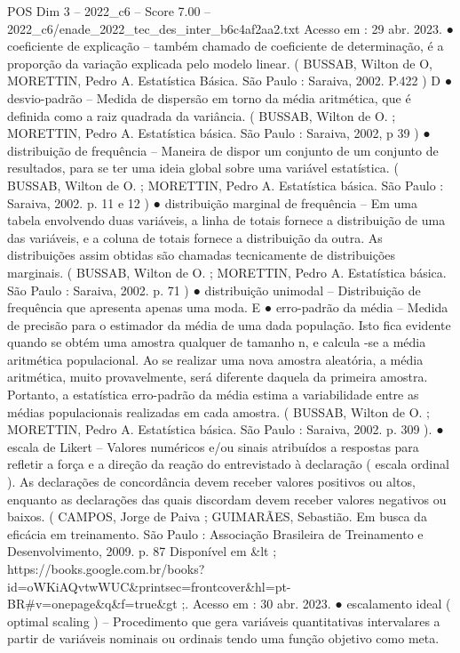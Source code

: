 \begin{textsample}{POS Dim 3 – 2022\_c6 – Score 7.00 – 2022\_c6/enade\_2022\_tec\_des\_inter\_b6c4af2aa2.txt}
Acesso em : 29 abr. 2023. {\EmojiFont ●} coeficiente de explicação – também chamado de coeficiente de determinação, é a proporção da variação explicada pelo modelo linear. ( BUSSAB, Wilton de O, MORETTIN, Pedro A.
Estatística Básica.
São Paulo : Saraiva, 2002.
P.422 ) D {\EmojiFont ●} desvio-padrão – Medida de dispersão em torno da média aritmética, que é definida como a raiz quadrada da variância. ( BUSSAB, Wilton de O. ; MORETTIN, Pedro A.
Estatística básica.
São Paulo : Saraiva, 2002, p 39 ) {\EmojiFont ●} distribuição de frequência – Maneira de dispor um conjunto de um conjunto de resultados, para se ter uma ideia global sobre uma variável estatística. ( BUSSAB, Wilton de O. ; MORETTIN, Pedro A.
Estatística básica.
São Paulo : Saraiva, 2002. p. 11 e 12 ) {\EmojiFont ●} distribuição marginal de frequência – Em uma tabela envolvendo duas variáveis, a linha de totais fornece a distribuição de uma das variáveis, e a coluna de totais fornece a distribuição da outra.
As distribuições assim obtidas são chamadas tecnicamente de distribuições marginais. ( BUSSAB, Wilton de O. ; MORETTIN, Pedro A.
Estatística básica.
São Paulo : Saraiva, 2002. p. 71 ) {\EmojiFont ●} distribuição unimodal – Distribuição de frequência que apresenta apenas uma moda.
E {\EmojiFont ●} erro-padrão da média – Medida de precisão para o estimador da média de uma dada população.
Isto fica evidente quando se obtém uma amostra qualquer de tamanho n, e calcula -se a média aritmética populacional.
Ao se realizar uma nova amostra aleatória, a média aritmética, muito provavelmente, será diferente daquela da primeira amostra.
Portanto, a estatística erro-padrão da média estima a variabilidade entre as médias populacionais realizadas em cada amostra. ( BUSSAB, Wilton de O. ; MORETTIN, Pedro A.
Estatística básica.
São Paulo : Saraiva, 2002. p. 309 ). {\EmojiFont ●} escala de Likert – Valores numéricos e/ou sinais atribuídos a respostas para refletir a força e a direção da reação do entrevistado à declaração ( escala ordinal ).
As declarações de concordância devem receber valores positivos ou altos, enquanto as declarações das quais discordam devem receber valores negativos ou baixos. ( CAMPOS, Jorge de Paiva ; GUIMARÃES, Sebastião.
Em busca da eficácia em treinamento.
São Paulo : Associação Brasileira de Treinamento e Desenvolvimento, 2009. p. 87 Disponível em \&lt ; https://books.google.com.br/books? id=oWKiAQvtwWUC\&printsec=frontcover\&hl=pt-BR\#v=onepage\&q\&f=true\&gt ;.
Acesso em : 30 abr. 2023. {\EmojiFont ●} escalamento ideal ( optimal scaling ) – Procedimento que gera variáveis quantitativas intervalares a partir de variáveis nominais ou ordinais tendo uma função objetivo como meta.

\end{textsample}
